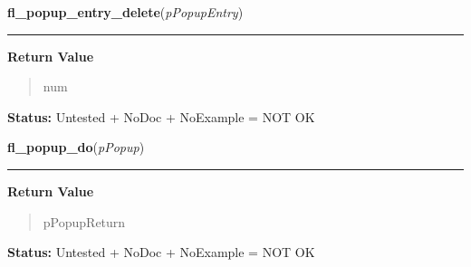     \label{xformslib:library:fl_popup_entry_delete}

    \vspace{0.5ex}

\hspace{.8\funcindent}\begin{boxedminipage}{\funcwidth}

    \raggedright \textbf{fl\_popup\_entry\_delete}(\textit{pPopupEntry})

    \vspace{-1.5ex}

    \rule{\textwidth}{0.5\fboxrule}
\setlength{\parskip}{2ex}
\setlength{\parskip}{1ex}
      \textbf{Return Value}
    \vspace{-1ex}

      \begin{quote}
      num

      \end{quote}

\textbf{Status:} Untested + NoDoc + NoExample = NOT OK



    \end{boxedminipage}

    \label{xformslib:library:fl_popup_do}

    \vspace{0.5ex}

\hspace{.8\funcindent}\begin{boxedminipage}{\funcwidth}

    \raggedright \textbf{fl\_popup\_do}(\textit{pPopup})

    \vspace{-1.5ex}

    \rule{\textwidth}{0.5\fboxrule}
\setlength{\parskip}{2ex}
\setlength{\parskip}{1ex}
      \textbf{Return Value}
    \vspace{-1ex}

      \begin{quote}
      pPopupReturn

      \end{quote}

\textbf{Status:} Untested + NoDoc + NoExample = NOT OK



    \end{boxedminipage}


